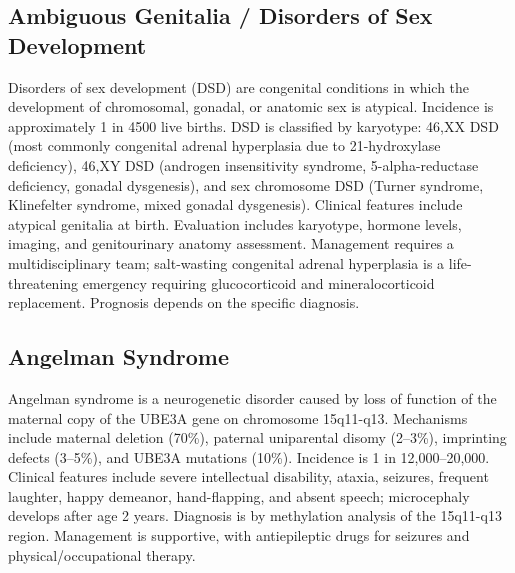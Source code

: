 \subsection{Ambiguous Genitalia / Disorders of Sex Development}
\label{sec:Ambiguous Genitalia}
Disorders of sex development (DSD) are congenital conditions in which the development of chromosomal, gonadal, or anatomic sex is atypical. Incidence is approximately 1 in 4500 live births. DSD is classified by karyotype: 46,XX DSD (most commonly congenital adrenal hyperplasia due to 21-hydroxylase deficiency), 46,XY DSD (androgen insensitivity syndrome, 5-alpha-reductase deficiency, gonadal dysgenesis), and sex chromosome DSD (Turner syndrome, Klinefelter syndrome, mixed gonadal dysgenesis). Clinical features include atypical genitalia at birth. Evaluation includes karyotype, hormone levels, imaging, and genitourinary anatomy assessment. Management requires a multidisciplinary team; salt-wasting congenital adrenal hyperplasia is a life-threatening emergency requiring glucocorticoid and mineralocorticoid replacement. Prognosis depends on the specific diagnosis.

\subsection{Angelman Syndrome}
\label{sec:Angelman Syndrome}
Angelman syndrome is a neurogenetic disorder caused by loss of function of the maternal copy of the UBE3A gene on chromosome 15q11-q13. Mechanisms include maternal deletion (70\%), paternal uniparental disomy (2--3\%), imprinting defects (3--5\%), and UBE3A mutations (10\%). Incidence is 1 in 12,000--20,000. Clinical features include severe intellectual disability, ataxia, seizures, frequent laughter, happy demeanor, hand-flapping, and absent speech; microcephaly develops after age 2 years. Diagnosis is by methylation analysis of the 15q11-q13 region. Management is supportive, with antiepileptic drugs for seizures and physical/occupational therapy.

